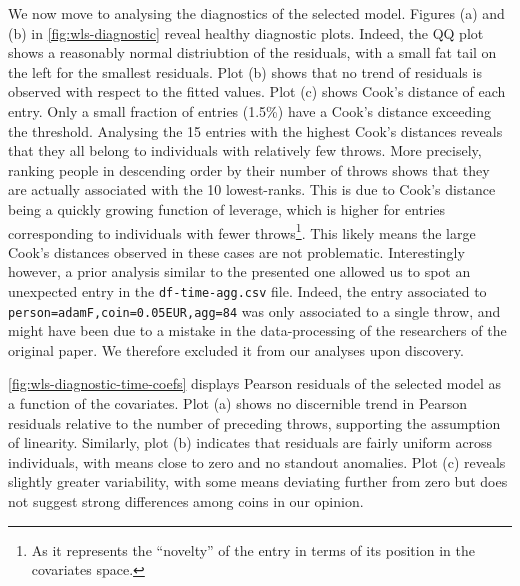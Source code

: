 \documentclass[a4paper, 12pt,oneside]{article}
\begin{document}
		We now move to analysing the diagnostics of the selected model. Figures (a) and (b) in \ref{fig:wls-diagnostic} reveal healthy diagnostic plots. Indeed, the QQ plot shows a reasonably normal distriubtion of the residuals, with a small fat tail on the left for the smallest residuals. Plot (b) shows that no trend of residuals is observed with respect to the fitted values. 
		Plot (c) shows Cook's distance of each entry. Only a small fraction of entries (1.5\%) have a Cook's distance exceeding the threshold. Analysing the 15 entries with the highest Cook's distances reveals that they all belong to individuals with relatively few throws. More precisely, ranking people in descending order by their number of throws shows that they are actually associated with the 10 lowest-ranks. This is due to Cook's distance being a quickly growing function of leverage, which is higher for entries corresponding to individuals with fewer throws\footnote{As it represents the ``novelty'' of the entry in terms of its position in the covariates space.}. This likely means the large Cook's distances observed in these cases are not problematic. Interestingly however, a prior analysis similar to the presented one allowed us to spot an unexpected entry in the \texttt{df-time-agg.csv} file. Indeed, the entry associated to \texttt{person=adamF,coin=0.05EUR,agg=84} was only associated to a single throw, and might have been due to a mistake in the data-processing of the researchers of the original paper. We therefore excluded it from our analyses upon discovery. 

		\ref{fig:wls-diagnostic-time-coefs} displays Pearson residuals of the selected model as a function of the covariates.
		Plot (a) shows no discernible trend in Pearson residuals relative to the number of preceding throws, supporting the assumption of linearity.
		Similarly, plot (b) indicates that residuals are fairly uniform across individuals, with means close to zero and no standout anomalies. Plot (c) reveals slightly greater variability, with some means deviating further from zero but does not suggest strong differences among coins in our opinion.
\end{document}
